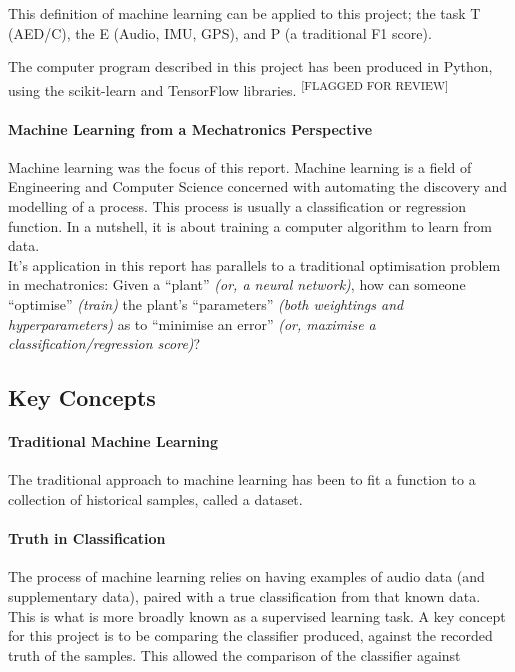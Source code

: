 \documentclass{UoNMCHA}
\newcommand{\flagforreview}{\textsuperscript{\color{red} [FLAGGED FOR REVIEW]}}
\newcommand{\inlineQuote}[1]{``#1''}
\numberwithin{equation}{section}
\begin{document}
This definition of machine learning can be applied to this project; the task T (AED/C), the E (Audio, IMU, GPS), and P (a traditional F1 score). 

The computer program described in this project has been produced in Python, using the scikit-learn and TensorFlow libraries. \flagforreview

\paragraph{Machine Learning from a Mechatronics Perspective}
Machine learning was the focus of this report. Machine learning is a field of Engineering and Computer Science concerned with automating the discovery and modelling of a process. This process is usually a classification or regression function. In a nutshell, it is about training a computer algorithm to learn from data.\\

It's application in this report has parallels to a traditional optimisation problem in mechatronics: Given a \inlineQuote{plant} {\itshape(or, a neural network)}, how can someone \inlineQuote{optimise} {\itshape(train)} the plant's \inlineQuote{parameters} {\itshape(both weightings and hyperparameters)} as to \inlineQuote{minimise an error} {\itshape(or, maximise a classification/regression score)}?

\subsection{Key Concepts}

\paragraph{Traditional Machine Learning}
The traditional approach to machine learning has been to fit a function to a collection of historical samples, called a dataset.

\paragraph{Truth in Classification}
The process of machine learning relies on having examples of audio data (and supplementary data), paired with a true classification from that known data. This is what is more broadly known as a supervised learning task. A key concept for this project is to be comparing the classifier produced, against the recorded truth of the samples. This allowed the comparison of the classifier against 
\end{document}

